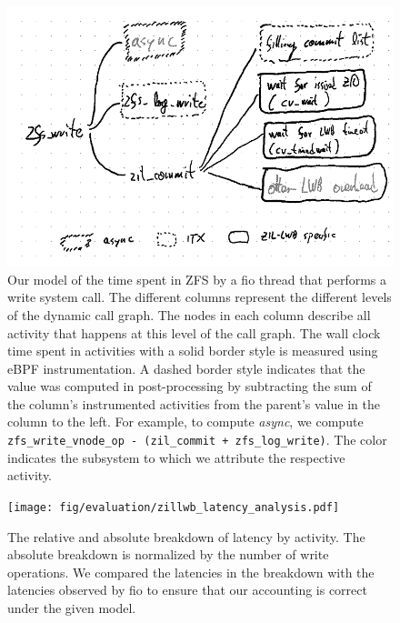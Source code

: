 \documentclass[12pt,a4paper,twoside]{book}
\begin{document}
\begin{figure}[H]
    \centering
    \includegraphics{fig/zil_lwb_latency_analysis__breakdown}
    \caption{Our model of the time spent in ZFS by a fio thread that performs a write system call.
    The different columns represent the different levels of the dynamic call graph.
    The nodes in each column describe all activity that happens at this level of the call graph.
    The wall clock time spent in activities with a solid border style is measured using eBPF instrumentation.
    A dashed border style indicates that the value was computed in post-processing by subtracting the sum of the column's instrumented activities from the parent's value in the column to the left.
    For example, to compute \textit{async}, we compute \lstinline{zfs_write_vnode_op - (zil_commit + zfs_log_write)}.
    The color indicates the subsystem to which we attribute the respective activity.
    }
    \label{fig:lwbanalysis:breakdown_model}
\end{figure}

\begin{figure}[H]
    \centering
    \texttt{[image: fig/evaluation/zillwb\_latency\_analysis.pdf]}
    \caption{The relative and absolute breakdown of latency by activity.
    The absolute breakdown is normalized by the number of write operations.
    We compared the latencies in the breakdown with the latencies observed by fio to ensure that our accounting is correct under the given model.
    }
    \label{fig:lwbanalysis:breakdown_charts}
\end{figure}
\end{document}
